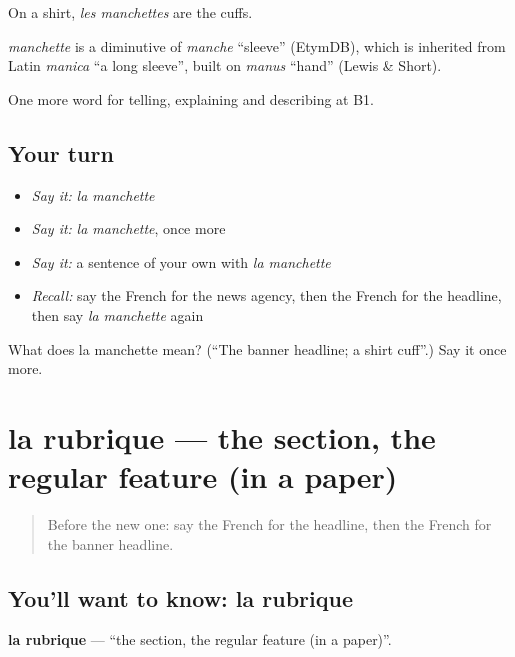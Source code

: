 On a shirt, \emph{les manchettes} are the cuffs.

\begin{cousinweb}
\emph{manchette} is a diminutive of \emph{manche} \textquotedblleft{}sleeve\textquotedblright{} (EtymDB), which is inherited from Latin \emph{manica} \textquotedblleft{}a long sleeve\textquotedblright{}, built on \emph{manus} \textquotedblleft{}hand\textquotedblright{} (Lewis \& Short).
\end{cousinweb}

\begin{grammarlens}[title={What you've built}]
One more word for telling, explaining and describing at B1.
\end{grammarlens}

\subsection*{Your turn}
\begin{itemize}
\raggedright
  \item \emph{Say it:} \emph{la manchette}
  \item \emph{Say it:} \emph{la manchette}, once more
  \item \emph{Say it:} a sentence of your own with \emph{la manchette}
  \item \emph{Recall:} say the French for the news agency, then the French for the headline, then say \emph{la manchette} again
\end{itemize}

\begin{tcolorbox}[breakable,colback=teal!4,colframe=teal!35!black,title={Before you move on}]
What does la manchette mean? (\textquotedblleft{}The banner headline; a shirt cuff\textquotedblright{}.) Say it once more.
\end{tcolorbox}
\section[la rubrique]{la rubrique — the section, the regular feature (in a paper)}

\label{lesson:FR-C282-rubrique}



\begin{quote}
Before the new one: say the French for the headline, then the French for the banner headline.
\end{quote}

\subsection*{You'll want to know: la rubrique}
\textbf{la rubrique} — \textquotedblleft{}the section, the regular feature (in a paper)\textquotedblright{}.

